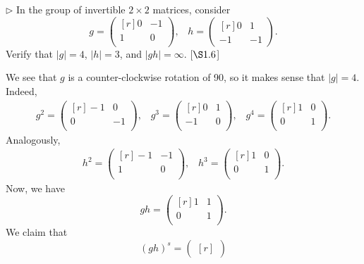 \begin{exercise}
	$\triangleright$ In the group of invertible $2\times 2$ matrices, consider
	\[
		g = 
		\begin{pmatrix*}[r]
			0 & -1\\
			1 & 0\\
		\end{pmatrix*},
		\; \; \;
		h= 
		\begin{pmatrix*}[r]
			0 & 1 \\
			-1 & -1
		\end{pmatrix*}.
	\]
	Verify that $|g| = 4$, $|h| = 3$, and $|gh| = \infty$. [$\S 1.6$]
\end{exercise}
\begin{solution}
	We see that $g$ is a counter-clockwise rotation of 90\degree, so it makes sense that $|g| = 4$. Indeed,
	\begin{gather*}
		g^2 = 
		\begin{pmatrix*}[r]
			-1 & 0\\
			0 & -1\\
		\end{pmatrix*},
		\; \; \;
		g^3 = 
		\begin{pmatrix*}[r]
			0 & 1\\
			-1 & 0\\
		\end{pmatrix*},
		\; \; \;
		g^4 = 
		\begin{pmatrix*}[r]
			1 & 0\\
			0 & 1\\
		\end{pmatrix*}.
	\end{gather*}
	Analogously, 
	\begin{gather*}
		h^2 = 
		\begin{pmatrix*}[r]
			-1 & -1\\
			1 & 0\\
		\end{pmatrix*},
		\; \; \;
		h^3 = 
		\begin{pmatrix*}[r]
			1 & 0\\
			0 & 1\\
		\end{pmatrix*}.
	\end{gather*}
	Now, we have
	\[
		gh = 
		\begin{pmatrix*}[r]
			1 & 1\\
			0 & 1\\
		\end{pmatrix*}.
	\]
	We claim that 
	\[
		(gh)^s =  
		\begin{pmatrix*}[r]

\end{pmatrix*}\]
\end{solution}
